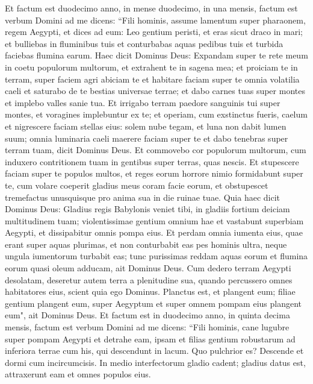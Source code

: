 \begin{biblechapter}  
\verse Et factum est duodecimo anno, in mense duodecimo, in una mensis, factum est verbum Domini ad me dicens: 
\verse “Fili hominis, assume lamentum super pharaonem, regem Aegypti, et dices ad eum: Leo gentium peristi, et eras sicut draco in mari; et bulliebas in fluminibus tuis et conturbabas aquas pedibus tuis et turbida faciebas flumina earum. 
\verse Haec dicit Dominus Deus: Expandam super te rete meum in coetu populorum multorum, et extrahent te in sagena mea; 
\verse et proiciam te in terram, super faciem agri abiciam te et habitare faciam super te omnia volatilia caeli et saturabo de te bestias universae terrae; 
\verse et dabo carnes tuas super montes et implebo valles sanie tua. 
\verse Et irrigabo terram paedore sanguinis tui super montes, et voragines implebuntur ex te; 
\verse et operiam, cum exstinctus fueris, caelum et nigrescere faciam stellas eius: solem nube tegam, et luna non dabit lumen suum; 
\verse omnia luminaria caeli maerere faciam super te et dabo tenebras super terram tuam, dicit Dominus Deus. 
\verse Et commovebo cor populorum multorum, cum induxero contritionem tuam in gentibus super terras, quas nescis. 
\verse Et stupescere faciam super te populos multos, et reges eorum horrore nimio formidabunt super te, cum volare coeperit gladius meus coram facie eorum, et obstupescet tremefactus unusquisque pro anima sua in die ruinae tuae. 
\verse Quia haec dicit Dominus Deus: Gladius regis Babylonis veniet tibi, 
\verse in gladiis fortium deiciam multitudinem tuam; violentissimae gentium omnium hae et vastabunt superbiam Aegypti, et dissipabitur omnis pompa eius. 
\verse Et perdam omnia iumenta eius, quae erant super aquas plurimas, et non conturbabit eas pes hominis ultra, neque ungula iumentorum turbabit eas; 
\verse tunc purissimas reddam aquas eorum et flumina eorum quasi oleum adducam, ait Dominus Deus. 
\verse Cum dedero terram Aegypti desolatam, deseretur autem terra a plenitudine sua, quando percussero omnes habitatores eius, scient quia ego Dominus. 
\verse Planctus est, et plangent eum; filiae gentium plangent eum, super Aegyptum et super omnem pompam eius plangent eum", ait Dominus Deus. 
\verse Et factum est in duodecimo anno, in quinta decima mensis, factum est verbum Domini ad me dicens: 
\verse “Fili hominis, cane lugubre super pompam Aegypti et detrahe eam, ipsam et filias gentium robustarum ad inferiora terrae cum his, qui descendunt in lacum. 
\verse Quo pulchrior es? Descende et dormi cum incircumcisis. 
\verse In medio interfectorum gladio cadent; gladius datus est, attraxerunt eam et omnes populos eius. 

\end{biblechapter}
